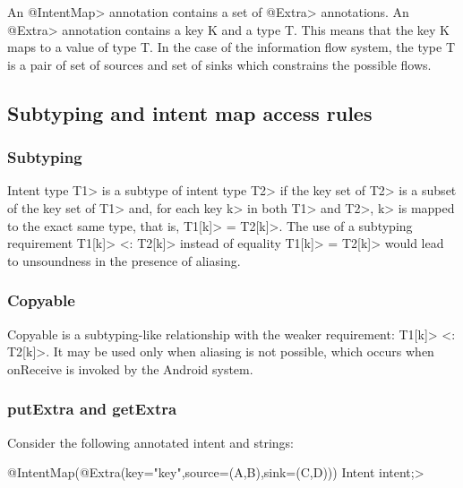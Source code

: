An \<@IntentMap> annotation contains a set of \<@Extra> annotations. An
\<@Extra> annotation contains a key K and a type T. This means that the key K 
maps to a value of type T. In the case of the information flow system, the type
T is a pair of set of sources and set of sinks which constrains the possible 
flows. 

\subsection{Subtyping and intent map access rules}

\subsubsection{Subtyping}
Intent type \<T1> is a subtype of intent type \<T2> if the key set of 
\<T2> is a subset of the key set of \<T1> and, for each key \<k> in both 
\<T1> and \<T2>, \<k> is mapped to the exact same type, that is, 
\<T1[k]> = \<T2[k]>. The use of a subtyping requirement \<T1[k]> <: \<T2[k]> 
instead of equality \<T1[k]> = \<T2[k]> would lead to unsoundness 
in the presence of aliasing.


\subsubsection{Copyable}
Copyable is a subtyping-like relationship with the weaker requirement: 
\<T1[k]> <: \<T2[k]>. It may be used only when aliasing is not possible, which
occurs when onReceive is invoked by the Android system.

\subsubsection{putExtra and getExtra}
Consider the following annotated intent and strings:

\<@IntentMap(@Extra(key="key",source=({A,B}),sink=({C,D})))
	Intent intent;>


